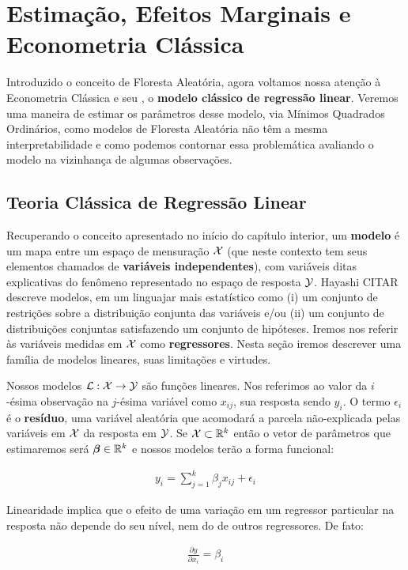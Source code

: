 
\chapter{Estimação, Efeitos Marginais e Econometria Clássica}

Introduzido o conceito de Floresta Aleatória, agora voltamos nossa atenção à Econometria Clássica e seu , o \textbf{modelo clássico de regressão linear}. Veremos uma maneira de estimar os parâmetros desse modelo, via Mínimos Quadrados Ordinários, como modelos de Floresta Aleatória não têm a mesma interpretabilidade e como podemos contornar essa problemática avaliando o modelo na vizinhança de algumas observações. 



\section{Teoria Clássica de Regressão Linear}

Recuperando o conceito apresentado no início do capítulo interior, um \textbf{modelo} é um mapa entre um espaço de mensuração $\mathcal{X}$ (que neste contexto tem seus elementos chamados de \textbf{variáveis independentes}), com variáveis ditas explicativas do fenômeno representado no espaço de resposta $\mathcal{Y}$. Hayashi CITAR descreve modelos, em um linguajar mais estatístico como (i) um conjunto de restrições sobre a distribuição conjunta das variáveis e/ou (ii) um conjunto de distribuições conjuntas satisfazendo um conjunto de hipóteses. Iremos nos referir às variáveis medidas em $\mathcal{X}$ como \textbf{regressores}. Nesta seção iremos descrever uma família de modelos lineares, suas limitações e virtudes.



\begin{hipotese}[Linearidade]
Nossos modelos $\mathcal{L} : \mathcal{X} \to \mathcal{Y}$ são funções lineares. Nos referimos ao valor da $i$-ésima observação na $j$-ésima variável como $x_{ij}$, sua resposta sendo $y_i$. O termo $\epsilon_i$ é o \textbf{resíduo}, uma variável aleatória que acomodará a parcela não-explicada pelas variáveis em $\mathcal{X}$ da resposta em $\mathcal{Y}$. Se $\mathcal{X} \subset \mathbb{R}^k$ então o vetor de parâmetros que estimaremos será $\boldsymbol{\beta} \in \mathbb{R}^k$ e nossos modelos terão a forma funcional:

\begin{align}
    y_i = \sum_{j = 1}^k \beta_j x_{ij} + \epsilon_i \label{mod_lin}
\end{align}

Linearidade implica que o efeito de uma variação em um regressor particular na resposta não depende do seu nível, nem do de outros regressores. De fato:

\begin{align}
    \frac{\partial y}{\partial x_i} = \beta_i
\end{align}
\end{hipotese}


